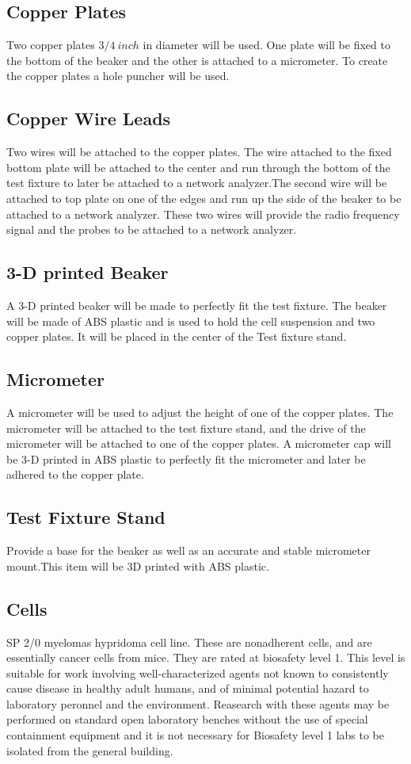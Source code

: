 \documentclass[journal]{IEEEtran}
\begin{document}
\subsection{Copper Plates}
Two copper plates $3/4 \: inch$ in diameter will be used. One plate will be fixed to the bottom of the beaker and the other is attached to a micrometer. To create the copper plates a hole puncher will be used.

\subsection{Copper Wire Leads}
Two wires will be attached to the copper plates. The wire attached to the fixed bottom plate will be attached to the center and run through the bottom of the test fixture to later be attached to a network analyzer.The second wire will be attached to top plate on one of the edges and run up the side of the beaker to be attached to a network analyzer. These two wires will provide the radio frequency signal and the probes to be attached to a network analyzer.

\subsection{3-D printed Beaker}
A 3-D printed beaker will be made to perfectly fit the test fixture. The beaker will be made of ABS plastic and is used to hold the cell suspension and two copper plates. It will be placed in the center of the Test fixture stand.

\subsection{Micrometer}
A micrometer will be used to adjust the height of one of the copper plates. The micrometer will be attached to the test fixture stand, and the drive of the micrometer will be attached to one of the copper plates. A micrometer cap will be 3-D printed in ABS plastic to perfectly fit the micrometer and later be adhered to the copper plate.

\subsection{Test Fixture Stand}
Provide a base for the beaker as well as an accurate and stable micrometer mount.This item will be 3D printed with ABS plastic.

\subsection{Cells}
SP 2/0 myelomas hypridoma cell line. These are nonadherent cells, and are essentially cancer cells from mice.\cite{mouse-myeloma-hybridoma-strain} They are rated at biosafety level 1. This level is suitable for work involving well-characterized agents not known to consistently cause disease in healthy adult humans, and of minimal potential hazard to laboratory peronnel and the environment. Reasearch with these agents may be performed on standard open laboratory benches without the use of special containment equipment and it is not necessary for Biosafety level 1 labs to be isolated from the general building.\cite{biosafety-levels}
\end{document}
